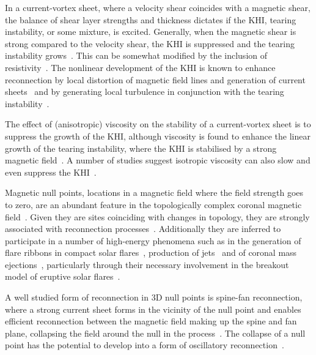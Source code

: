In a current-vortex sheet, where a velocity shear coincides with a magnetic shear, the balance of shear layer strengths and thickness dictates if the KHI, tearing instability, or some mixture, is excited. Generally, when the magnetic shear is strong compared to the velocity shear, the KHI is suppressed and the tearing instability grows~\cite{einaudiResistiveInstabilitiesFlowing1986}. This can be somewhat modified by the inclusion of resistivity~\cite{einaudiResistiveInstabilitiesFlowing1989}. The nonlinear development of the KHI is known to enhance reconnection by local distortion of magnetic field lines and generation of current sheets~\cite{minEffectsMagneticReconnection1997} and by generating local turbulence in conjunction with the tearing instability~\cite{kowalKelvinHelmholtzTearingInstability2020}.

The effect of (anisotropic) viscosity on the stability of a current-vortex sheet is to suppress the growth of the KHI, although viscosity is found to enhance the linear growth of the tearing instability, where the KHI is stabilised by a strong magnetic field~\cite{einaudiResistiveInstabilitiesFlowing1989}. A number of studies suggest isotropic viscosity can also slow and even suppress the KHI~\cite{howsonEffectsResistivityViscosity2017,roedigerViscousKelvinHelmholtzInstabilities2013a,wyperKelvinHelmholtzInstabilityCurrentvortex2013}.

Magnetic null points, locations in a magnetic field where the field strength goes to zero, are an abundant feature in the topologically complex coronal magnetic field~\cite{edwardsNullPointDistribution2015}. Given they are sites coinciding with changes in topology, they are strongly associated with reconnection processes~\cite{yangImagingSpectralStudy2020,sunHOTSPINELOOPS2013}. Additionally they are inferred to participate in a number of high-energy phenomena such as in the generation of flare ribbons in compact solar flares~\cite{massonNATUREFLARERIBBONS2009,pontinWhyAreFlare2016a}, production of jets~\cite{moreno-insertisPLASMAJETSERUPTIONS2013} and of coronal mass ejections~\cite{barnesRelationshipCoronalMagnetic2007,zouContinuousNullPointMagnetic2020}, particularly through their necessary involvement in the breakout model of eruptive solar flares~\cite{AntiochosCME199,macleanTopologicalAnalysisMagnetic2005}.

A well studied form of reconnection in 3D null points is spine-fan reconnection, where a strong current sheet forms in the vicinity of the null point and enables efficient reconnection between the magnetic field making up the spine and fan plane, collapsing the field around the null in the process~\cite{thurgoodImplosiveCollapseMagnetic2018}. The collapse of a null point has the potential to develop into a form of oscillatory reconnection~\cite{thurgoodThreedimensionalOscillatoryMagnetic2017}.

